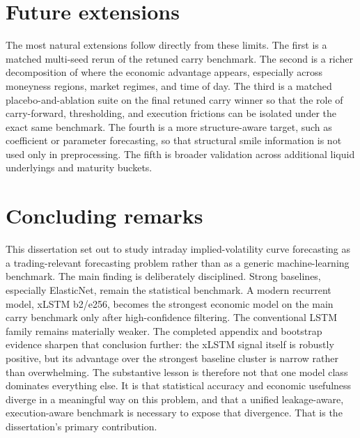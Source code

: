 \documentclass[12pt]{report}
\begin{document}
\section{Future extensions}
The most natural extensions follow directly from these limits. The first is a matched multi-seed rerun of the retuned carry benchmark. The second is a richer decomposition of where the economic advantage appears, especially across moneyness regions, market regimes, and time of day. The third is a matched placebo-and-ablation suite on the final retuned carry winner so that the role of carry-forward, thresholding, and execution frictions can be isolated under the exact same benchmark. The fourth is a more structure-aware target, such as coefficient or parameter forecasting, so that structural smile information is not used only in preprocessing. The fifth is broader validation across additional liquid underlyings and maturity buckets.

\section*{Concluding remarks}
This dissertation set out to study intraday implied-volatility curve forecasting as a trading-relevant forecasting problem rather than as a generic machine-learning benchmark. The main finding is deliberately disciplined. Strong baselines, especially ElasticNet, remain the statistical benchmark. A modern recurrent model, xLSTM b2/e256, becomes the strongest economic model on the main carry benchmark only after high-confidence filtering. The conventional LSTM family remains materially weaker. The completed appendix and bootstrap evidence sharpen that conclusion further: the xLSTM signal itself is robustly positive, but its advantage over the strongest baseline cluster is narrow rather than overwhelming. The substantive lesson is therefore not that one model class dominates everything else. It is that statistical accuracy and economic usefulness diverge in a meaningful way on this problem, and that a unified leakage-aware, execution-aware benchmark is necessary to expose that divergence. That is the dissertation's primary contribution.
\end{document}
